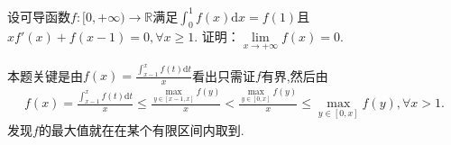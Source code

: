 \documentclass[../../main.tex]{subfiles}%
\begin{document}
\begin{example}
设可导函数$f:[0,+\infty)\to\mathbb{R}$满足$\int_0^1 f(x)\mathrm{d}x = f(1)$且 $x f'(x) + f(x - 1) = 0, \forall x \geqslant 1$. 证明：$\lim\limits_{x\to+\infty} f(x) = 0$.
\end{example}
\begin{note}
本题关键是由$f\left( x \right) =\frac{\int_{x-1}^x{f\left( t \right) \mathrm{d}t}}{x}$看出只需证$f$有界,然后由
\begin{align*}
f\left( x \right) =\frac{\int_{x-1}^x{f\left( t \right) \mathrm{d}t}}{x}\leqslant \frac{\underset{y\in \left[ x-1,x \right]}{\max}f\left( y \right)}{x}<\frac{\underset{y\in \left[ 0,x \right]}{\max}f\left( y \right)}{x}\leqslant \underset{y\in \left[ 0,x \right]}{\max}f\left( y \right) ,\forall x>1.
\end{align*}
发现$f$的最大值就在在某个有限区间内取到.
\end{note}
\end{document}
